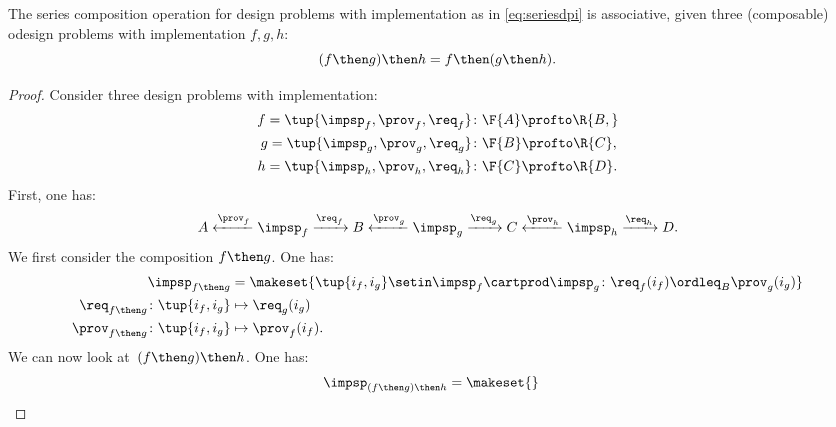 {    \begin{lemma}
        The series composition operation for design problems with implementation as in \cref{eq:seriesdpi} is associative, \ie  given three (composable) odesign problems with implementation $f,g,h$:
        \begin{equation}
            (f\then g)
            \then h = f\then (g\then h).
        \end{equation}
    \end{lemma}
    \begin{proof}
        Consider three design problems with implementation:
        \begin{equation}
            \begin{aligned}
                f=\tup{{\impsp_f, \prov_f, \req_f} } & \colon \F{A} \profto\R{B,} \\
                g=\tup{\impsp_g, \prov_g, \req_g}    & \colon \F{B} \profto \R{C}, \\
                h=\tup{\impsp_h, \prov_h, \req_h}    & \colon \F{C} \profto \R{D}.
            \end{aligned}
        \end{equation}
        First, one has:
        \begin{equation}
            A \xleftarrow{\prov_f} \impsp_f \xrightarrow{\req_f} B
            \xleftarrow{\prov_g} \impsp_g \xrightarrow{\req_g} C
            \xleftarrow{\prov_h} \impsp_h \xrightarrow{\req_h} D.
        \end{equation}
        We first consider the composition $f\then g$.
        One has:
        \begin{equation}
            \begin{aligned}
                \impsp_{f\then g}                       & = \makeset{
                    \tup{i_f,i_g} \setin \impsp_f \cartprod \impsp_g \colon
                    \req_f(i_f) \ordleq_{B} \prov_g(i_g)
                } \\
                \req_{f\then g}  \colon  \tup{i_f,i_g}  & \mapsto \req_g(i_g) \\
                \prov_{f\then g}  \colon  \tup{i_f,i_g} & \mapsto \prov_f(i_f).
            \end{aligned}
        \end{equation}
        We can now look at~$(f\then g)\then h$.
        One has:
        \begin{equation}
            \begin{aligned}
                 & \impsp_{(f\then g)\then h} = \makeset{
}
\end{aligned}
\end{equation}
\end{proof}}
